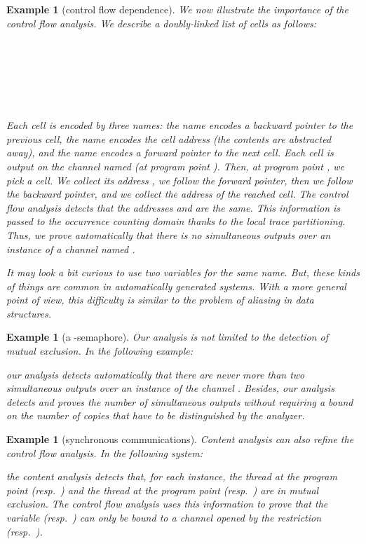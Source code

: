 \documentclass{article}
\newcommand{\boxexample}{}
\newtheorem{example}[thm]{Example}
\newcommand{\pp}[1]{}
\newcommand{\pps}[1]{(at program point \pp{#1})}
\newcommand{\cfalabg}{6}
\newcommand{\synlabb}{2}
\newcommand{\synlabc}{3}
\newcommand{\synlabe}{5}
\newcommand{\synlabf}{6}
\begin{document}
\begin{example}[control flow dependence]
\label{cfahelp}
We now illustrate the importance of the control flow analysis.
We describe a doubly-linked list of cells as follows:

\begin{tabbing}
\=\=\\
\\
\\
\>\\
\>\\ 

\end{tabbing}
Each cell is encoded by three names: the name  encodes a backward pointer to the previous cell, the name  encodes the cell address (the contents are abstracted away), and  the name  encodes a forward pointer to the next cell.
Each cell is output on the channel named  \pps{\cfalabg}. 
Then, at program point , we pick a cell.
We collect its address , we follow the forward pointer, 
then we follow the backward pointer, 
and we collect the address  of the reached cell. 
The control flow analysis \cite{feret:sas2000} detects that the addresses
  and  are the same. This information is passed to the occurrence counting domain thanks to the local trace partitioning. Thus, we prove automatically that there is no simultaneous outputs over an instance of a channel named .

It may look a bit curious to use two variables for the same name. 
But, these kinds of things are common in automatically generated systems. 
With a more general point of view, this difficulty is similar to the problem of aliasing in data structures. \boxexample
\end{example}

{
\begin{example}[a -semaphore]
Our analysis is not limited to the detection of mutual exclusion.
In the following example: 

 our analysis detects automatically that 
there are never more than two simultaneous outputs over an instance of the channel .
Besides, our analysis detects and proves the number of simultaneous outputs without requiring a bound on the number of copies that have to be distinguished by the analyzer. 
\boxexample
\end{example}}

{\begin{example}[synchronous communications]
Content analysis can also refine the control flow analysis.
In the following system:

the content analysis detects that, for each instance, the thread at the program point \pp{\synlabb} (resp.~\pp{\synlabf}) and the thread at the program point \pp{\synlabc} (resp.~\pp{\synlabe}) are in mutual exclusion. 
The control flow analysis uses this information to prove that the variable  (resp.~) can only be bound to a channel opened by the restriction  (resp.~).
\boxexample\end{example}}
\end{document}
